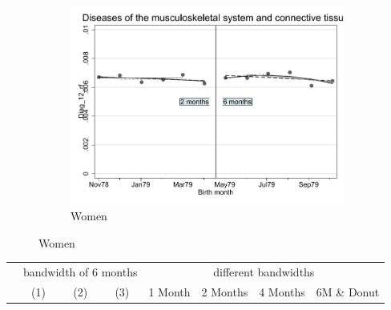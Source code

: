 \documentclass[a4paper ]{article}
\begin{document}
\begin{figure}[h]
\begin{subfigure}[t]{0.31\textwidth}
		\centering
		\includegraphics[width=0.99\textwidth]{R1_RD_Diag_12_rf_fits}
		\caption{Women}
	\end{subfigure}
\end{figure}


\begin{table}[h]\centering
\def\sym#1{\ifmmode^{#1}\else\(^{#1}\)\fi}
\begin{tabular}{l*{3}{c}|cccc}
\toprule
&\multicolumn{3}{c}{bandwidth of 6 months} & \multicolumn{4}{c}{different bandwidths} \\
 \cmidrule(lr{1em}){2-4} \cmidrule(lr{1em}){5-8}
 &\multicolumn{1}{c}{(1)}&\multicolumn{1}{c}{(2)}&\multicolumn{1}{c}{(3)}& 1 Month & 2 Months & 4 Months & 6M \& Donut \\
\midrule 

\bottomrule
\end{tabular}
\end{table}
\end{document}

